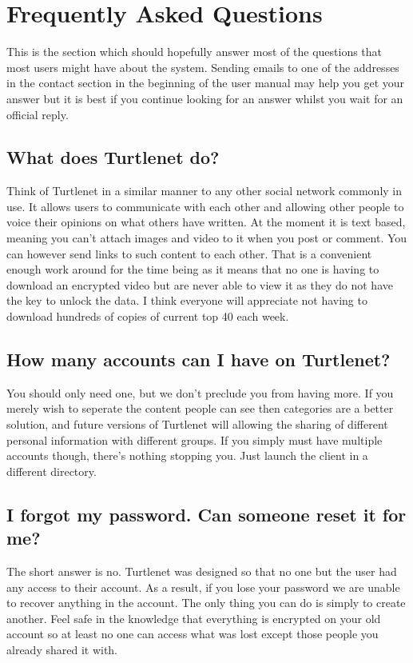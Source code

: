 \section{Frequently Asked Questions}
This is the section which should hopefully answer most of the questions that
most users might have about the system.  Sending emails to one of the addresses 
in the contact section in the beginning of the user manual may help you get your
answer but it is best if you continue looking for an answer whilst you wait for
an official reply.

\subsection{What does Turtlenet do?}
Think of Turtlenet in a similar manner to any other social network commonly in
use.  It allows users to communicate with each other and allowing other people
to voice their opinions on what others have written.  At the moment it is text
based, meaning you can't attach images and video to it when you post or comment.
You can however send links to such content to each other.  That is a convenient
enough work around for the time being as it
means that no one is having to download an encrypted video but are never able to
view it as they do not have the key to unlock the data.  I think everyone will
appreciate not having to download hundreds of copies of current top 40 each week.

\subsection{How many accounts can I have on Turtlenet?}
You should only need one, but we don't preclude you from having more. If you
merely wish to seperate the content people can see then categories are a better
solution, and future versions of Turtlenet will allowing the sharing of
different personal information with different groups. If you simply must have
multiple accounts though, there's nothing stopping you. Just launch the client
in a different directory.

\subsection{I forgot my password.  Can someone reset it for me?}
The short answer is no.  Turtlenet was designed so that no one but the user had
any access to their account.  As
a result, if you lose your password we are unable to recover anything in the
account.  The only thing you can do is simply to create another.  Feel safe in 
the knowledge that everything is encrypted on your old account so at least no 
one can access what was lost except those people you already shared it with.

